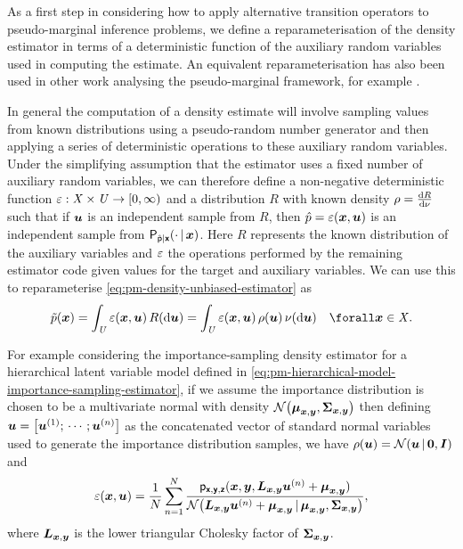 As a first step in considering how to apply alternative transition operators to pseudo-marginal inference problems, we define a reparameterisation of the density estimator in terms of a deterministic function of the auxiliary random variables used in computing the estimate. An equivalent reparameterisation has also been used in other work analysing the pseudo-marginal framework, for example \citep{doucet2015efficient}.

In general the computation of a density estimate will involve sampling values from known distributions using a pseudo-random number generator and then applying a series of deterministic operations to these auxiliary random variables. Under the simplifying assumption that the estimator uses a fixed number of auxiliary random variables, we can therefore define a non-negative deterministic function $\varepsilon : \mathit{X} \times \mathit{U} \to [0,\infty)$ and a distribution $R$ with known density $\rho = \frac{\mathrm{d} R}{\mathrm{d} \nu}$ such that if $\boldsymbol{u}$ is an independent sample from $R$, then $\hat{p} = \varepsilon(\boldsymbol{x},\boldsymbol{u})$ is an independent sample from $\mathsf{P}_{\hat{\mathsf{p}}|\boldsymbol{\mathsf{x}}}( \cdot \operatorname{|} \boldsymbol{x})$. Here $R$ represents the known distribution of the auxiliary variables and $\varepsilon$ the operations performed by the remaining estimator code given values for the target and auxiliary variables. We can use this to reparameterise \eqref{eq:pm-density-unbiased-estimator} as
\begin{equation}\label{eq:density-unbiased-estimator-property}
  \utgtdens(\vct{x}) =
  \int_{\set{U}} \esttgtdens(\vct{x},\vct{u})\,R(\dr\vct{u}) =
  \int_{\set{U}} \esttgtdens(\vct{x},\vct{u})\,\rho(\vct{u})\,\nu(\dr\vct{u})
  \quad \forall \vct{x} \in \set{X}.
\end{equation}

For example considering the importance-sampling density estimator for a hierarchical latent variable model defined in \eqref{eq:pm-hierarchical-model-importance-sampling-estimator}, if we assume the importance distribution is chosen to be a multivariate normal with density $\nrm{\vct{\mu}_{\vct{x},\vct{y}},\mtx{\Sigma}_{\vct{x},\vct{y}}}$ then defining $\vct{u} = \lsb \vct{u}^{(1)}; \,\cdots\,; \vct{u}^{(n)}\rsb$ as the concatenated vector of standard normal variables used to generate the importance distribution samples, we have $\rho(\vct{u}) = \nrm{\vct{u}\gvn\vct{0},\mtx{I}}$ and
\begin{equation}\label{eq:importance-sampling-density-estimator-reparameterisation}
  \esttgtdens(\vct{x},\vct{u}) = \frac{1}{N} \sum_{n=1}^N
  \frac
    {\pden{\rvct{x},\rvct{y},\rvct{z}}(\vct{x},\vct{y},\mtx{L}_{\vct{x},\vct{y}}\vct{u}^{(n)} + \vct{\mu}_{\vct{x},\vct{y}})}
    {\nrm{\mtx{L}_{\vct{x},\vct{y}}\vct{u}^{(n)} + \vct{\mu}_{\vct{x},\vct{y}} \gvn \vct{\mu}_{\vct{x},\vct{y}},\mtx{\Sigma}_{\vct{x},\vct{y}}}},
\end{equation}
where $\boldsymbol{L}_{\boldsymbol{x},\boldsymbol{y}}$ is the lower triangular Cholesky factor of $\boldsymbol{\Sigma}_{\boldsymbol{x},\boldsymbol{y}}$.

